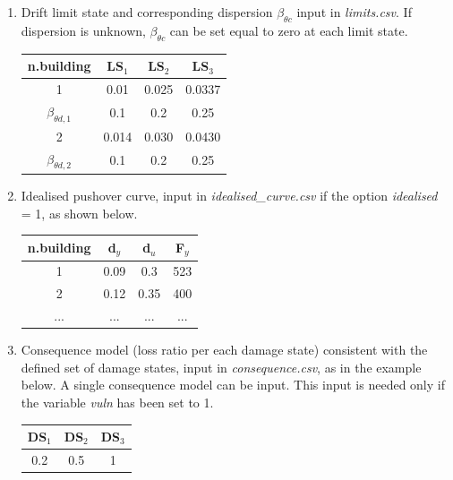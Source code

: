 \begin{enumerate}
\item Drift limit state and corresponding dispersion $\beta_{\theta c}$ input in \textit{limits.csv}. If dispersion is unknown, $\beta_{\theta c}$ can be set equal to zero at each limit state.
	\begin{table}[!htbp]
	\centering
	\begin{tabular}{|c|c|c|c|} \hline
	\textbf{n.building} & \textbf{LS$_1$} &	\textbf{LS$_2$} &	\textbf{LS$_3$} \\ \hline
	1 & 0.01 &	0.025 & 0.0337\\ \hline
	$\beta_{\theta d, 1}$ &	0.1 & 0.2 & 0.25\\ \hline
	2 & 0.014 &	0.030 & 0.0430\\ \hline
	$\beta_{\theta d, 2}$ &	0.1 & 0.2 & 0.25\\ \hline
	\end{tabular}
	\end{table}

\item Idealised pushover curve, input in \textit{idealised\_curve.csv} if the option \textit{idealised} = 1, as shown below. 
\begin{table}[!htbp]
\centering
\begin{tabular}{|c|c|c|c|} \hline
\textbf{n.building} & \textbf{d$_y$} & \textbf{d$_u$} & \textbf{F$_y$} \\ \hline
1 & 0.09	& 0.3	 & 523\\ \hline
2 & 0.12	& 0.35	 & 400\\ \hline
... & ...	& ... & ...\\ \hline
\end{tabular}
\end{table}

\item Consequence model (loss ratio per each damage state) consistent with the defined set of damage states, input in \textit{consequence.csv}, as in the example below. A single consequence model can be input. This input is needed only if the variable \textit{vuln} has been set to 1.
	\begin{table}[!htbp]
	\centering
	\begin{tabular}{|c|c|c|} \hline
	\textbf{DS$_1$} & \textbf{DS$_2$} & \textbf{DS$_3$} \\ \hline
	0.2	& 0.5	 & 1\\ \hline
	\end{tabular}
	\end{table}
	
\end{enumerate}

